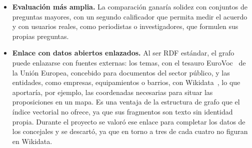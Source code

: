 \documentclass[11pt, a4paper]{report}
\begin{document}
\begin{itemize}
		RAG vectorial depende de un servicio externo de reordenación, y el
		reordenador local de respaldo es menos preciso. Un modelo de reordenación
		de tipo \textit{cross-encoder} ejecutado en local reduciría esa
		dependencia, y queda por medir con qué pérdida de precisión.
		\item \textbf{Evaluación más amplia.} La comparación ganaría solidez con
		conjuntos de preguntas mayores, con un segundo calificador que permita
		medir el acuerdo y con usuarios reales, como periodistas o investigadores,
		que formulen sus propias preguntas.
		\item \textbf{Enlace con datos abiertos enlazados.} Al ser RDF estándar,
		el grafo puede enlazarse con fuentes externas: los temas, con el tesauro
		EuroVoc~\cite{eurovoc} de la Unión Europea, concebido para documentos del sector público,
		y las entidades, como empresas, equipamientos o barrios, con Wikidata~\cite{wikidata}, lo
		que aportaría, por ejemplo, las coordenadas necesarias para situar las
		proposiciones en un mapa. Es una ventaja de la estructura de grafo que el índice vectorial no ofrece, ya que sus fragmentos son texto sin identidad
		propia. Durante el proyecto se valoró ese enlace para completar los datos
		de los concejales y se descartó, ya que en torno a tres de cada cuatro no
		figuran en Wikidata.
	\end{itemize}
\end{document}
